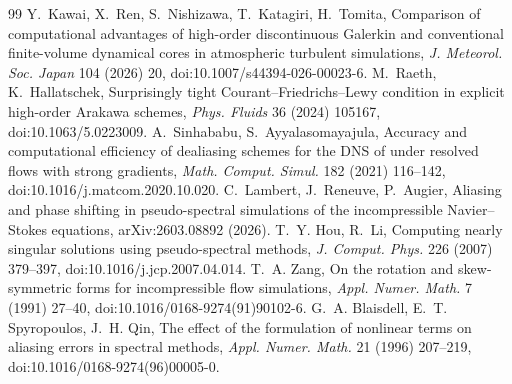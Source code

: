 \documentclass[11pt,a4paper]{article}
\begin{document}
\begin{thebibliography}{99}
Y.~Kawai, X.~Ren, S.~Nishizawa, T.~Katagiri, H.~Tomita, Comparison of computational advantages of high-order discontinuous Galerkin and conventional finite-volume dynamical cores in atmospheric turbulent simulations, \emph{J. Meteorol. Soc. Japan} 104 (2026) 20, doi:10.1007/s44394-026-00023-6.
M.~Raeth, K.~Hallatschek, Surprisingly tight Courant--Friedrichs--Lewy condition in explicit high-order Arakawa schemes, \emph{Phys. Fluids} 36 (2024) 105167, doi:10.1063/5.0223009.
A.~Sinhababu, S.~Ayyalasomayajula, Accuracy and computational efficiency of dealiasing schemes for the DNS of under resolved flows with strong gradients, \emph{Math. Comput. Simul.} 182 (2021) 116--142, doi:10.1016/j.matcom.2020.10.020.
C.~Lambert, J.~Reneuve, P.~Augier, Aliasing and phase shifting in pseudo-spectral simulations of the incompressible Navier--Stokes equations, arXiv:2603.08892 (2026).
T.~Y. Hou, R.~Li, Computing nearly singular solutions using pseudo-spectral methods, \emph{J. Comput. Phys.} 226 (2007) 379--397, doi:10.1016/j.jcp.2007.04.014.
T.~A. Zang, On the rotation and skew-symmetric forms for incompressible flow simulations, \emph{Appl. Numer. Math.} 7 (1991) 27--40, doi:10.1016/0168-9274(91)90102-6.
G.~A. Blaisdell, E.~T. Spyropoulos, J.~H. Qin, The effect of the formulation of nonlinear terms on aliasing errors in spectral methods, \emph{Appl. Numer. Math.} 21 (1996) 207--219, doi:10.1016/0168-9274(96)00005-0.
\end{thebibliography}
\end{document}
